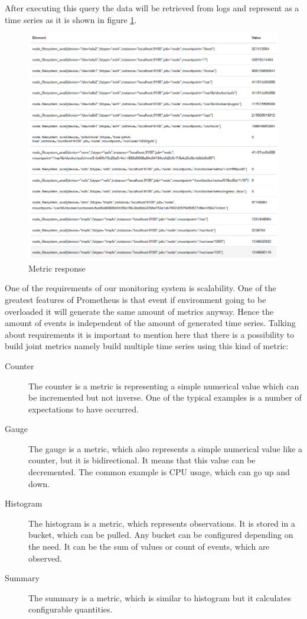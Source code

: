 After executing this query the data will be retrieved from logs and represent as a time series as it is shown in figure \ref{fig:monitoring_req}.



\begin{figure}[H]
\begin{center}
  \includegraphics[width=\linewidth]{components/3/monitoring_req.png}
  \caption{Metric response}
  \label{fig:monitoring_req}
\end{center}
\end{figure}

One of the requirements of our monitoring system is scalability. One of the greatest features of Prometheus is that event if environment going to be overloaded it will generate the same amount of metrics anyway. Hence the amount of events is independent of the amount of generated time series. 
Talking about requirements it is important to mention here that there is a possibility to build joint metrics namely build multiple time series using this kind of metric:

\begin{description}
\item[Counter] The counter is a metric is representing a simple numerical value which can be incremented but not inverse. One of the typical examples is a number of expectations to have occurred. 
\item[Gauge] The gauge is a metric, which also represents a simple numerical value like a counter, but it is bidirectional. It means that this value can be decremented. The common example is CPU usage, which can go up and down.
\item[Histogram] The histogram is a metric, which represents observations.  It is stored in a bucket, which can be pulled. Any bucket can be configured depending on the need. It can be the sum of values or count of events, which are observed.
\item[Summary] The summary is a metric, which is similar to histogram but it calculates configurable quantities. 
\end{description}

